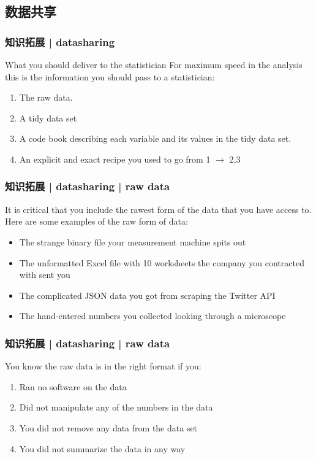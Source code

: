 \subsection{数据共享}
\begin{frame}
  \frametitle{知识拓展 | datasharing}
  \begin{block}{What you should deliver to the statistician}
    For maximum speed in the analysis this is the information you should pass to a statistician:
    \begin{enumerate}
      \item The raw data.
      \item A tidy data set
      \item A code book describing each variable and its values in the tidy data set.
      \item An explicit and exact recipe you used to go from 1 $\rightarrow$ 2,3
    \end{enumerate}
  \end{block}
\end{frame}

\begin{frame}
  \frametitle{知识拓展 | datasharing | raw data}
  It is critical that you include the rawest form of the data that you have access to. Here are some examples of the raw form of data:
  \begin{itemize}
    \item The strange binary file your measurement machine spits out
    \item The unformatted Excel file with 10 worksheets the company you contracted with sent you
    \item The complicated JSON data you got from scraping the Twitter API
    \item The hand-entered numbers you collected looking through a microscope
  \end{itemize}
\end{frame}

\begin{frame}
  \frametitle{知识拓展 | datasharing | raw data}
  You know the raw data is in the right format if you:
  \begin{enumerate}
    \item Ran no software on the data
    \item Did not manipulate any of the numbers in the data
    \item You did not remove any data from the data set
    \item You did not summarize the data in any way
  \end{enumerate}
\end{frame}

